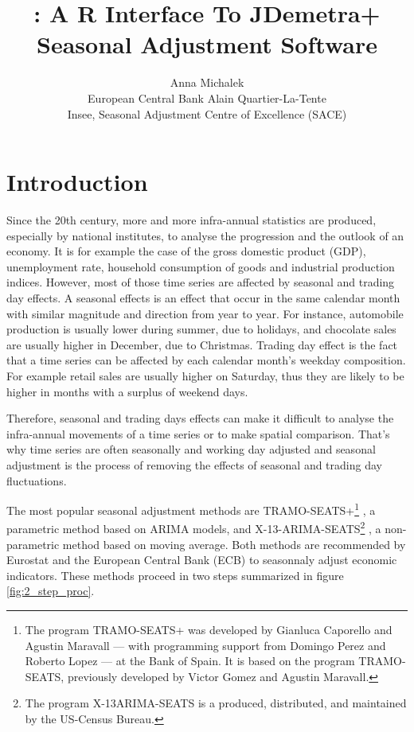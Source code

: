 \documentclass[article]{jss}
\author{
Anna Michalek\\European Central Bank \And Alain Quartier-La-Tente\\Insee, Seasonal Adjustment Centre of Excellence (SACE)
}
\title{\pkg{RJDemetra}: A R Interface To JDemetra+ Seasonal Adjustment Software}
\begin{document}
\hypertarget{introduction}{%
\section{Introduction}\label{introduction}}

Since the 20th century, more and more infra-annual statistics are
produced, especially by national institutes, to analyse the progression
and the outlook of an economy. It is for example the case of the gross
domestic product (GDP), unemployment rate, household consumption of
goods and industrial production indices. However, most of those time
series are affected by seasonal and trading day effects. A seasonal
effects is an effect that occur in the same calendar month with similar
magnitude and direction from year to year. For instance, automobile
production is usually lower during summer, due to holidays, and
chocolate sales are usually higher in December, due to Christmas.
Trading day effect is the fact that a time series can be affected by
each calendar month's weekday composition. For example retail sales are
usually higher on Saturday, thus they are likely to be higher in months
with a surplus of weekend days.

Therefore, seasonal and trading days effects can make it difficult to
analyse the infra-annual movements of a time series or to make spatial
comparison. That's why time series are often seasonally and working day
adjusted and seasonal adjustment is the process of removing the effects
of seasonal and trading day fluctuations.

The most popular seasonal adjustment methods are TRAMO-SEATS+\footnote{The
  program TRAMO-SEATS+ was developed by Gianluca Caporello and Agustin
  Maravall --- with programming support from Domingo Perez and Roberto
  Lopez --- at the Bank of Spain. It is based on the program
  TRAMO-SEATS, previously developed by Victor Gomez and Agustin
  Maravall.} \citep{gomez1996programs, caporello2004program}, a
parametric method based on ARIMA models, and X-13-ARIMA-SEATS\footnote{The
  program X-13ARIMA-SEATS is a produced, distributed, and maintained by
  the US-Census Bureau.} \citep{findleyx12, ladiray1999x11en}, a
non-parametric method based on moving average. Both methods are
recommended by Eurostat and the European Central Bank (ECB) to
seasonnaly adjust economic indicators. These methods proceed in two
steps summarized in figure \ref{fig:2_step_proc}.
\end{document}
